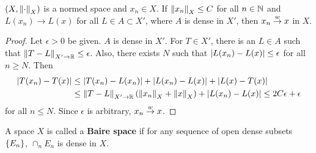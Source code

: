 \begin{proposition}
    $(X,\left\lVert {\cdot} \right\rVert_X)$ is a normed space and $x_n\in X$. If 
    $\left\lVert {x_n} \right\rVert_X\leq C$ for all $n\in\mathbb{N}$ and $L(x_n)\to L(x)$ 
    for all $L\in A\subset X'$, where $A$ is dense in $X'$, then 
    $x_n\overset{w}{\to} x$ in $X$.
\end{proposition}
\begin{proof}
    Let $\epsilon>0$ be given. $A$ is dense in $X'$. For $T\in X'$, 
    there is an $L\in A$ such that $\left\lVert {T-L} \right\rVert_{X'\to\mathbb{R}}\leq\epsilon$. 
    Also, there exists $N$ such that $\left\lvert {L(x_n)-L(x)} \right\rvert\leq\epsilon$ 
    for all $n\geq N$. Then
    \begin{equation*}
        \begin{split}
            \left\lvert {T(x_n) - T(x)} \right\rvert &\leq \left\lvert {T(x_n) - L(x_n)} \right\rvert + \left\lvert {L(x_n) - L(x)} \right\rvert + \left\lvert {L(x) - T(x)} \right\rvert \\
            &\leq \left\lVert {T-L} \right\rVert_{X'\to\mathbb{R}}(\left\lVert {x_n} \right\rVert_X + \left\lVert {x} \right\rVert_X) + \left\lvert {L(x_n) - L(x)} \right\rvert
            \leq 2C\epsilon + \epsilon
        \end{split}
    \end{equation*}
    for all $n\leq N$. Since $\epsilon$ is arbitrary, $x_n\overset{w}{\to} x$.
\end{proof}

\begin{definition}
    A space $X$ is called a \textbf{Baire space} if for any 
    sequence of open dense subsets $\left\{ {E_n} \right\}$, $\cap_n E_n$ 
    is dense in $X$.
\end{definition}

